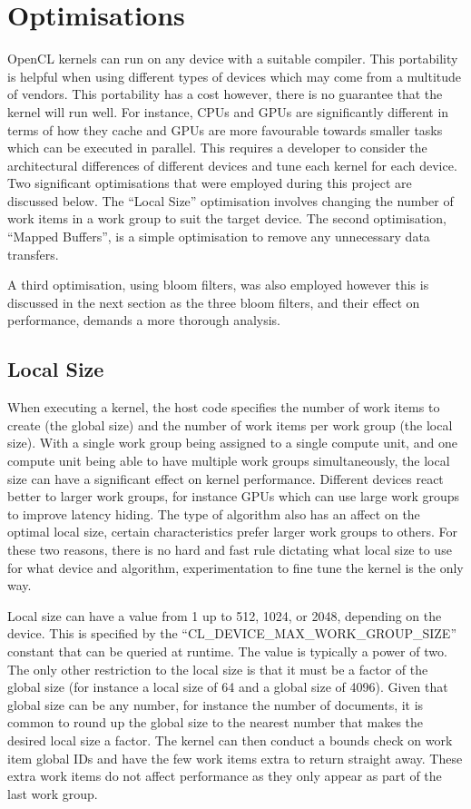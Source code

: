 \section{Optimisations}

OpenCL kernels can run on any device with a suitable compiler. This portability
is helpful when using different types of devices which may come from a multitude
of vendors. This portability has a cost however, there is no guarantee that the
kernel will run well. For instance, CPUs and GPUs are significantly different in
terms of how they cache and GPUs are more favourable towards smaller tasks which
can be executed in parallel. This requires a developer to consider the
architectural differences of different devices and tune each kernel for each
device. Two significant optimisations that were employed during this project are
discussed below. The ``Local Size'' optimisation involves changing the number of
work items in a work group to suit the target device. The second optimisation,
``Mapped Buffers'', is a simple optimisation to remove any unnecessary data
transfers.

A third optimisation, using bloom filters, was also employed however this is
discussed in the next section as the three bloom filters, and their effect on
performance, demands a more thorough analysis.

\subsection{Local Size}

When executing a kernel, the host code specifies the number of work items to
create (the global size) and the number of work items per work group (the local
size). With a single work group being assigned to a single compute unit, and one
compute unit being able to have multiple work groups simultaneously, the local
size can have a significant effect on kernel performance. Different devices
react better to larger work groups, for instance GPUs which can use large work
groups to improve latency hiding. The type of algorithm also has an affect on
the optimal local size, certain characteristics prefer larger work groups to
others. For these two reasons, there is no hard and fast rule dictating what
local size to use for what device and algorithm, experimentation to fine tune
the kernel is the only way.

Local size can have a value from 1 up to 512, 1024, or 2048, depending on the
device. This is specified by the ``CL\_DEVICE\_MAX\_WORK\_GROUP\_SIZE'' constant
that can be queried at runtime. The value is typically a power of two. The only
other restriction to the local size is that it must be a factor of the global
size (for instance a local size of 64 and a global size of 4096). Given that
global size can be any number, for instance the number of documents, it is
common to round up the global size to the nearest number that makes the desired
local size a factor. The kernel can then conduct a bounds check on work item
global IDs and have the few work items extra to return straight away. These
extra work items do not affect performance as they only appear as part of the
last work group.

